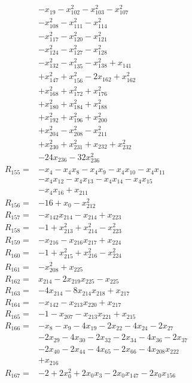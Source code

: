 \begin{align*}
&-x_{19} -x_{102}^{2} -x_{103}^{2} -x_{107}^{2}\\
&-x_{108}^{2} -x_{111}^{2} -x_{114}^{2}\\
&-x_{117}^{2} -x_{120}^{2} -x_{121}^{2}\\
&-x_{124}^{2} -x_{127}^{2} -x_{128}^{2}\\
&-x_{132}^{2} -x_{135}^{2} -x_{138}^{2} +x_{141}\\
&+x_{147}^{2} +x_{156}^{2} -2x_{162} +x_{162}^{2}\\
&+x_{168}^{2} +x_{172}^{2} +x_{176}^{2}\\
&+x_{180}^{2} +x_{184}^{2} +x_{188}^{2}\\
&+x_{192}^{2} +x_{196}^{2} +x_{200}^{2}\\
&+x_{204}^{2} -x_{208}^{2} -x_{211}^{2}\\
&+x_{230}^{2} +x_{231}^{2} +x_{232} +x_{232}^{2}\\
&-24x_{236} -32x_{236}^{2}\\[3pt]
R_{155}={}&-x_{4} -x_{4}x_{8} -x_{4}x_{9} -x_{4}x_{10} -x_{4}x_{11}\\
&-x_{4}x_{12} -x_{4}x_{13} -x_{4}x_{14} -x_{4}x_{15}\\
&-x_{4}x_{16} +x_{211}\\[3pt]
R_{156}={}&-16 +x_{0} -x_{212}^{2}\\[3pt]
R_{157}={}&-x_{142}x_{214} -x_{214} +x_{223}\\[3pt]
R_{158}={}&-1 +x_{213}^{2} +x_{214}^{2} -x_{223}^{2}\\[3pt]
R_{159}={}&-x_{216} -x_{216}x_{217} +x_{224}\\[3pt]
R_{160}={}&-1 +x_{215}^{2} +x_{216}^{2} -x_{224}^{2}\\[3pt]
R_{161}={}&-x_{208}^{2} +x_{225}\\[3pt]
R_{162}={}&x_{214} -2x_{219}x_{225} -x_{225}\\[3pt]
R_{163}={}&-4x_{214} -8x_{214}x_{218} +x_{217}\\[3pt]
R_{164}={}&-x_{142} -x_{213}x_{220} +x_{217}\\[3pt]
R_{165}={}&-1 -x_{207} -x_{213}x_{221} +x_{215}\\[3pt]
R_{166}={}&-x_{8} -x_{9} -4x_{19} -2x_{22} -4x_{24} -2x_{27}\\
&-2x_{29} -4x_{30} -2x_{32} -2x_{34} -4x_{36} -2x_{37}\\
&-2x_{40} -2x_{44} -4x_{65} -2x_{66} -4x_{208}x_{222}\\
&+x_{216}\\[3pt]
R_{167}={}&-2 +2x_{0}^{2} +2x_{0}x_{3} -2x_{0}x_{147} -2x_{0}x_{156}\\

\end{align*}
